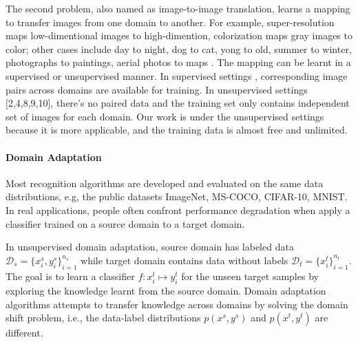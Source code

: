 \documentclass{article}
\begin{document}
The second problem, also named as image-to-image translation, learns a mapping to transfer images from one domain to another. For example, super-resolution \cite{Ledig_2017_CVPR} maps low-dimentional images to high-dimention, colorization \cite{10.1007/978-3-319-46487-9_40} maps gray images to color; other cases include day to night, dog to cat, yong to old, summer to winter, photographs to paintings, aerial photos to maps \cite{DBLP:journals/corr/TaigmanPW16, Li_2018_ECCV, Kaneko_2017_CVPR, NIPS2017_6642, DBLP:journals/corr/abs-1711-11585, DBLP:journals/corr/KaracanAEE16, Zhang_2017_CVPR}. The mapping can be learnt in a supervised or unsupervised manner. In supervised settings \cite{Isola_2017_CVPR, 10.1007/978-3-319-46475-6_43, 10.1007/978-3-319-46493-0_20}, corresponding image pairs across domains are available for training. In unsupervised settings [2,4,8,9,10], there's no paired data and the training set only contains independent set of images for each domain. Our work is under the unsupervised settings because it is more applicable, and the training data is almost free and unlimited.


\paragraph{Domain Adaptation}
Most recognition algorithms are developed and evaluated on the same data distributions, e.g, the public datasets ImageNet, MS-COCO, CIFAR-10, MNIST. In real applications, people often confront performance degradation when apply a classifier trained on a source domain to a target domain.

In unsupervised domain adaptation, source domain has labeled data $\mathcal{D}_s = {\{x_i^s, y_i^s\}}_{i=1}^{n_s}$ while target domain contains data without labels $\mathcal{D}_t = {\{x_i^t\}}_{i=1}^{n_t}$. The goal is to learn a classifier $f: x_i^t \mapsto y_i^t$ for the unseen target samples by exploring the knowledge learnt from the source domain. Domain adaptation algorithms attempts to transfer knowledge across domains by solving the domain shift problem, i.e., the data-label distributions $p(x^s, y^s)$ and $p(x^t, y^t)$ are different.
\end{document}
